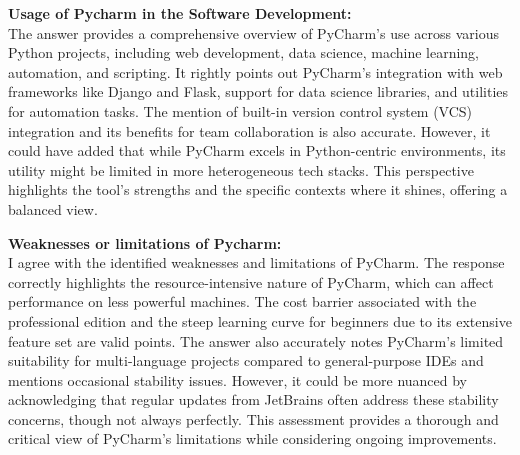 \documentclass[a4paper, 11pt]{report}
\begin{document}
\textbf{Usage of Pycharm in the Software Development:} \\
\noindent The answer provides a comprehensive overview of PyCharm’s use across various Python projects, including web development, data science, machine learning, automation, and scripting. It rightly points out PyCharm’s integration with web frameworks like Django and Flask, support for data science libraries, and utilities for automation tasks.\cite{van2023hands} The mention of built-in version control system (VCS) integration and its benefits for team collaboration is also accurate. However, it could have added that while PyCharm excels in Python-centric environments, its utility might be limited in more heterogeneous tech stacks. This perspective highlights the tool’s strengths and the specific contexts where it shines, offering a balanced view.

\textbf{Weaknesses or limitations of Pycharm:} \\
\noindent I agree with the identified weaknesses and limitations of PyCharm. The response correctly highlights the resource-intensive nature of PyCharm, which can affect performance on less powerful machines. The cost barrier associated with the professional edition and the steep learning curve for beginners due to its extensive feature set are valid points. The answer also accurately notes PyCharm’s limited suitability for multi-language projects compared to general-purpose IDEs and mentions occasional stability issues.\cite{parconcomparison} However, it could be more nuanced by acknowledging that regular updates from JetBrains often address these stability concerns, though not always perfectly. This assessment provides a thorough and critical view of PyCharm’s limitations while considering ongoing improvements.



\usepackage{amsmath}
\usepackage{graphicx}
\end{document}
